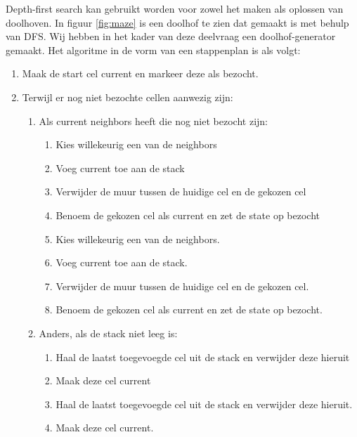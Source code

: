 Depth-first search kan gebruikt worden voor zowel het maken als oplossen van doolhoven. In figuur \ref{fig:maze} is een doolhof te zien dat gemaakt is met behulp van DFS. Wij hebben in het kader van deze deelvraag een doolhof-generator gemaakt. Het algoritme in de vorm van een stappenplan is als volgt:

\begin{enumerate}
\item Maak de start cel current en markeer deze als bezocht.
\item Terwijl er nog niet bezochte cellen aanwezig zijn:
	\begin{enumerate}
	\item Als current neighbors heeft die nog niet bezocht zijn:
		\begin{enumerate}
		\item Kies willekeurig een van de neighbors
		\item Voeg current toe aan de stack
		\item Verwijder de muur tussen de huidige cel en de gekozen cel
		\item Benoem de gekozen cel als current en zet de state op bezocht
		\item Kies willekeurig een van de neighbors.
		\item Voeg current toe aan de stack.
		\item Verwijder de muur tussen de huidige cel en de gekozen cel.
		\item Benoem de gekozen cel als current en zet de state op bezocht.
		\end{enumerate}			
	
	\item Anders, als de stack niet leeg is:
		\begin{enumerate}
		\item Haal de laatst toegevoegde cel uit de stack en verwijder deze hieruit
		\item Maak deze cel current
		\item Haal de laatst toegevoegde cel uit de stack en verwijder deze hieruit.
		\item Maak deze cel current.
		\end{enumerate}	
	\end{enumerate}
\end{enumerate}
